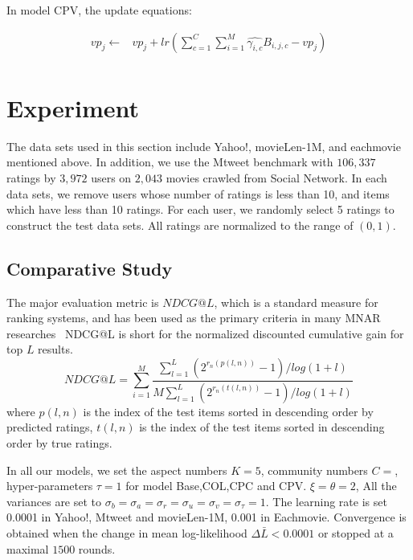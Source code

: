 \documentclass{sig-alternate}
\begin{document}
In model CPV, the update equations:

\begin{eqnarray}
vp_j\leftarrow & vp_j+lr(\sum\limits_{c=1}^{C}\sum\limits_{i=1}^{M}\hat{\gamma_{i,c}}B_{i,j,c}-vp_j)\\\nonumber
\end{eqnarray}


\section{Experiment}\label{sec:experiment}

The data sets used in this section include Yahoo!, movieLen-1M, and eachmovie mentioned above. In addition, we use the Mtweet benchmark with $106,337$ ratings by $3,972$ users on $2,043$ movies crawled from Social Network. In each data sets, we remove users whose number of ratings is less than 10, and items which have less than 10 ratings. For each user, we randomly select 5 ratings to construct the test data sets. All ratings are normalized to the range of $(0,1)$.


\subsection{Comparative Study}

The major evaluation metric is $NDCG@L$, which is a standard measure for ranking systems, and has been used as the primary criteria in many MNAR researches~\cite{Hernandez-Lobato2014Probabilistic,Marlin2009Collaborative}  NDCG@L is short for the normalized discounted cumulative gain for top $L$ results. 
\begin{equation}
NDCG@L=\sum\limits_{i=1}^{M}\frac{\sum_{l=1}^{L}(2^{r_{n}(p(l,n))}-1)/log(1+l)}{M\sum_{l=1}^{L}(2^{r_{n}(t(l,n))}-1)/log(1+l)}
\end{equation}
where $p(l,n)$ is the index of the test items sorted in descending order by predicted ratings, $t(l,n)$ is the index of the test items sorted in descending order by true ratings.

In all our models, we set the aspect numbers $K=5$, community numbers $C=$, hyper-parameters  $\tau=1$ for model Base,COL,CPC and CPV.  $\xi=\theta=2$, All the variances are set to $\sigma_b=\sigma_a=\sigma_r=\sigma_u=\sigma_v=\sigma_\tau=1$. The learning rate is set 0.0001 in Yahoo!, Mtweet and movieLen-1M, 0.001 in Eachmovie. Convergence is obtained when the change in mean log-likelihood $\Delta\bar{L}<0.0001$ or stopped at a maximal $1500$ rounds.
\end{document}
